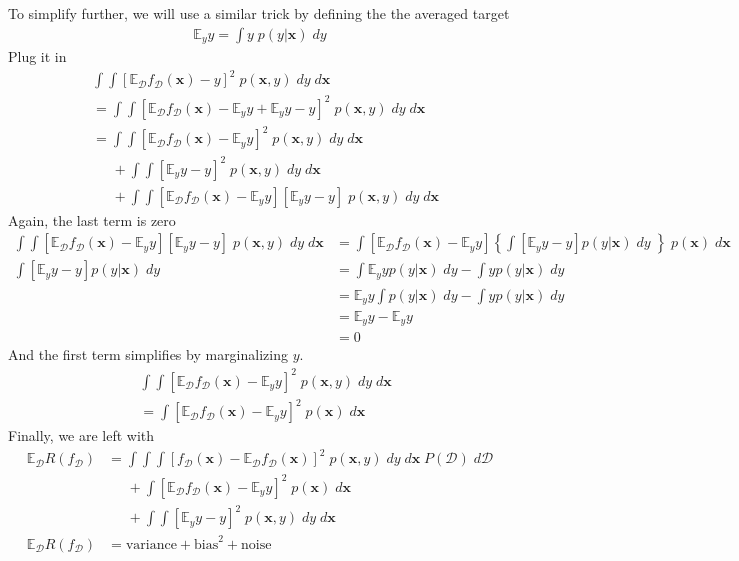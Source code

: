 \documentclass[11pt]{article}
\newcommand{\vct}[1]{\boldsymbol{#1}} %
\newcommand{\ProbOpr}[1]{\mathbb{#1}}
\begin{document}
To simplify further, we will use a similar trick by defining the the averaged target
\begin{align*}
\ProbOpr{E}_y y = \int y\; p(y|\vct{x})\;dy
\end{align*}
Plug it in
\begin{align*}
&\int \int  [\ProbOpr{E}_{\mathcal{D}} f_{\mathcal{D}}(\vct{x}) -y]^2 \;p(\vct{x},y) \;dy \;d\vct{x}\\
&= \int \int  [\ProbOpr{E}_{\mathcal{D}} f_{\mathcal{D}}(\vct{x}) - \ProbOpr{E}_y y + \ProbOpr{E}_y y -y]^2 \;p(\vct{x},y) \;dy \;d\vct{x}\\
&= \int \int  [\ProbOpr{E}_{\mathcal{D}} f_{\mathcal{D}}(\vct{x}) - \ProbOpr{E}_y y]^2 \;p(\vct{x},y) \;dy \;d\vct{x} \\
&\;\;\;\;\;+ \int \int  [\ProbOpr{E}_y y - y]^2 \;p(\vct{x},y) \;dy \;d\vct{x} \\
&\;\;\;\;\;+ \int \int  [\ProbOpr{E}_{\mathcal{D}} f_{\mathcal{D}}(\vct{x}) - \ProbOpr{E}_y y][\ProbOpr{E}_y y -y] \;p(\vct{x},y) \;dy \;d\vct{x}
\end{align*}
Again, the last term is zero 
\begin{align*}
\int \int  [\ProbOpr{E}_{\mathcal{D}} f_{\mathcal{D}}(\vct{x}) - \ProbOpr{E}_y y][\ProbOpr{E}_y y -y] \;p(\vct{x},y) \;dy \;d\vct{x}
&= \int  [\ProbOpr{E}_{\mathcal{D}} f_{\mathcal{D}}(\vct{x}) - \ProbOpr{E}_y y]\left\{\int [\ProbOpr{E}_y y -y] p(y|\vct{x}) \; dy \; \right\} \;p(\vct{x}) \;d\vct{x}\\
\int [\ProbOpr{E}_y y -y] p(y|\vct{x}) \; dy &= \int \ProbOpr{E}_y y p(y|\vct{x}) \; dy  - \int y p(y|\vct{x}) \; dy\\
&=  \ProbOpr{E}_y y \int p(y|\vct{x}) \; dy  - \int y p(y|\vct{x}) \; dy\\
&=  \ProbOpr{E}_y y - \ProbOpr{E}_y y\\
&=0
\end{align*}
And the first term simplifies by marginalizing $y$.
\begin{align*}
&\int \int  [\ProbOpr{E}_{\mathcal{D}} f_{\mathcal{D}}(\vct{x}) - \ProbOpr{E}_y y]^2 \;p(\vct{x},y) \;dy \;d\vct{x}\\
&= \int  [\ProbOpr{E}_{\mathcal{D}} f_{\mathcal{D}}(\vct{x}) - \ProbOpr{E}_y y]^2 \;p(\vct{x}) \;d\vct{x}
\end{align*}
Finally, we are left with
\begin{align*}
\ProbOpr{E}_{\mathcal{D}} R(f_{\mathcal{D}}) &=   \int \int \int [f_{\mathcal{D}}(\vct{x})-\ProbOpr{E}_{\mathcal{D}} f_{\mathcal{D}}(\vct{x})]^2 \;p(\vct{x},y) \;dy \;d\vct{x}\; P(\mathcal{D})\;d\mathcal{D} \\ &\;\;\;\;\; +\int  [\ProbOpr{E}_{\mathcal{D}} f_{\mathcal{D}}(\vct{x}) - \ProbOpr{E}_y y]^2 \;p(\vct{x}) \;d\vct{x} \\&\;\;\;\;\; + \int \int  [\ProbOpr{E}_y y - y]^2 \;p(\vct{x},y) \;dy \;d\vct{x} \\
\ProbOpr{E}_{\mathcal{D}} R(f_{\mathcal{D}}) &= \text{variance} + \text{bias}^2 + \text{noise}
\end{align*}
\end{document}
